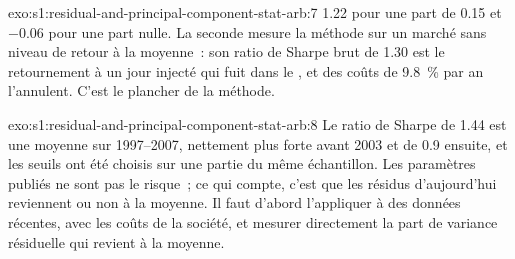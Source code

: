 \begin{solution}{exo:s1:residual-and-principal-component-stat-arb:7}
1.22 pour une part de 0.15 et $-0.06$ pour une part nulle. La seconde mesure la méthode sur un marché sans niveau de retour à la moyenne~: son ratio de Sharpe brut de 1.30 est le
retournement à un jour injecté qui fuit dans le , et des coûts de 9.8~\% par an l'annulent. C'est le plancher de la méthode.
\end{solution}

\begin{solution}{exo:s1:residual-and-principal-component-stat-arb:8}
Le ratio de Sharpe de 1.44 est une moyenne sur 1997--2007, nettement plus forte avant 2003 et de 0.9 ensuite, et les seuils ont été choisis sur une partie du même
échantillon. Les paramètres publiés ne sont pas le risque~; ce qui compte, c'est que les résidus d'aujourd'hui reviennent ou non à la moyenne. Il faut d'abord l'appliquer à des données récentes, avec les coûts de la société, et mesurer directement la
part de variance résiduelle qui revient à la moyenne.
\end{solution}

